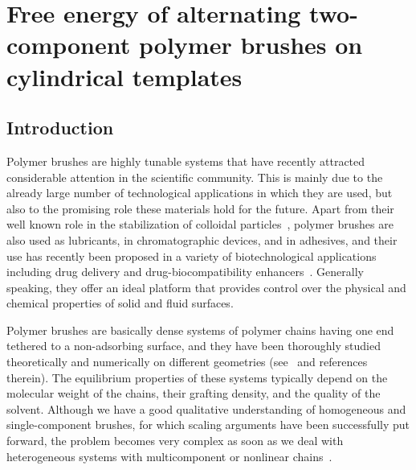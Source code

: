 \chapter{Free energy of alternating two-component polymer brushes on cylindrical templates}
\label{chap:brush}

 
\section{Introduction}\label{sec:brushanisotropy}

Polymer brushes are highly tunable systems that have recently attracted 
considerable attention in the scientific community. This is mainly due to the 
already large number of technological applications in which they are used, but also to 
the promising role these materials hold for the future. 
Apart from their well known role in the stabilization of colloidal particles~\cite{Napper}, 
polymer brushes are also used as lubricants, in chromatographic devices, and in adhesives,
and their use has recently been proposed in a variety of biotechnological applications including
drug delivery and drug-biocompatibility enhancers~\cite{Dragan,Caster,Ponisseril, Stuart}. Generally speaking, they offer an ideal platform that provides 
control over the physical and chemical properties  of solid and fluid surfaces.
 
Polymer brushes are basically dense systems of polymer chains having one end tethered
to a non-adsorbing surface, and they have been thoroughly studied theoretically 
and numerically on different geometries
(see~\cite{Milner,deGennes,BinderBook,Cotton,Alexander,Halperin,CatesPB, Zhulina,RusselPB,BinderPB} and references therein). The equilibrium properties of these systems 
typically depend on the molecular weight of the chains, their grafting density, and the quality 
of the solvent. Although we have a good qualitative understanding of homogeneous and single-component 
brushes, for which scaling arguments have been successfully put forward, the problem becomes 
very complex as soon as we deal  with heterogeneous systems with multicomponent or nonlinear chains~\cite{vanakaras,linse}.

